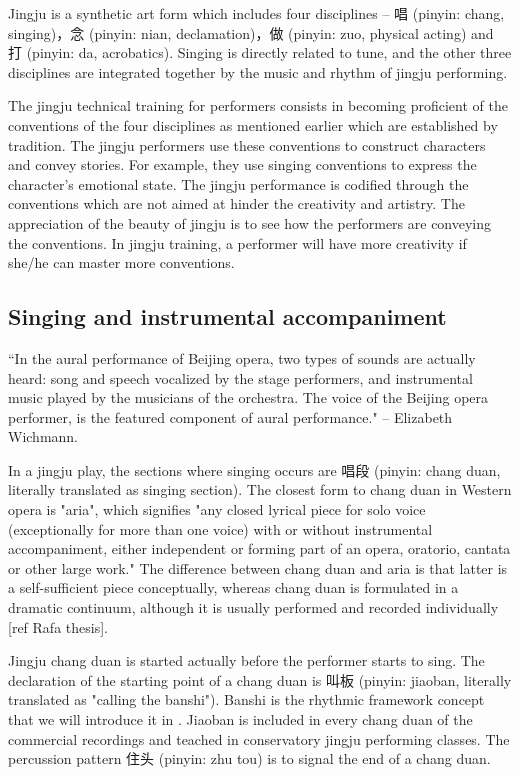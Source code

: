 Jingju is a synthetic art form which includes four disciplines -- 唱 (pinyin: chang, singing)，念 (pinyin: nian, declamation)，做 (pinyin: zuo, physical acting) and 打 (pinyin: da, acrobatics). Singing is directly related to tune, and the other three disciplines are integrated together by the music and rhythm of jingju performing. 

The jingju technical training for performers consists in becoming proficient of the conventions of the four disciplines as mentioned earlier which are established by tradition. The jingju performers use these conventions to construct characters and convey stories. For example, they use singing conventions to express the character's emotional state. The jingju performance is codified through the conventions which are not aimed at hinder the creativity and artistry. The appreciation of the beauty of jingju is to see how the performers are conveying the conventions. In jingju training, a performer will have more creativity if she/he can master more conventions.

\subsection{Singing and instrumental accompaniment}

``In the aural performance of Beijing opera, two types of sounds are actually heard: song and speech vocalized by the stage performers, and instrumental music played by the musicians of the orchestra. The voice of the Beijing opera performer, is the featured component of aural performance." -- Elizabeth Wichmann.

In a jingju play, the sections where singing occurs are 唱段 (pinyin: chang duan, literally translated as singing section). The closest form to chang duan in Western opera is "aria", which signifies "any closed lyrical piece for solo voice (exceptionally for more than one voice) with or without instrumental accompaniment, either independent or forming part of an opera, oratorio, cantata or other large work." The difference between chang duan and aria is that latter is a self-sufficient piece conceptually, whereas chang duan is formulated in a dramatic continuum, although it is usually performed and recorded individually [ref Rafa thesis]. 

Jingju chang duan is started actually before the performer starts to sing. The declaration of the starting point of a chang duan is 叫板 (pinyin: jiaoban, literally translated as "calling the banshi"). Banshi is the rhythmic framework concept that we will introduce it in . Jiaoban is included in every chang duan of the commercial recordings and teached in conservatory jingju performing classes. The percussion pattern 住头 (pinyin: zhu tou) is to signal the end of a chang duan.

